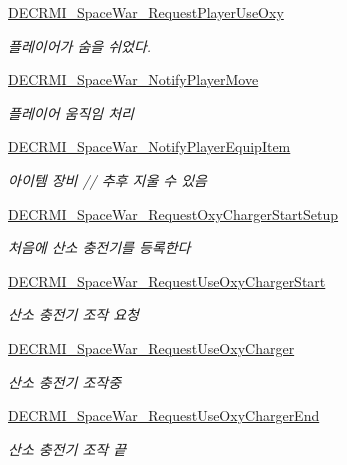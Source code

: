 \begin{DoxyCompactItemize}
\hyperlink{class_server_ab6e38c5e64aecc2a60ef4301d4dd3376}{D\+E\+C\+R\+M\+I\+\_\+\+Space\+War\+\_\+\+Request\+Player\+Use\+Oxy}
\begin{DoxyCompactList}\small\item\em 플레이어가 숨을 쉬었다. \end{DoxyCompactList}\item 
\hyperlink{class_server_a513d5189f9ce57d2e4e35c3128677ce4}{D\+E\+C\+R\+M\+I\+\_\+\+Space\+War\+\_\+\+Notify\+Player\+Move}
\begin{DoxyCompactList}\small\item\em 플레이어 움직임 처리 \end{DoxyCompactList}\item 
\hyperlink{class_server_afc97eded17d998b195ab89607b02a675}{D\+E\+C\+R\+M\+I\+\_\+\+Space\+War\+\_\+\+Notify\+Player\+Equip\+Item}
\begin{DoxyCompactList}\small\item\em 아이템 장비 // 추후 지울 수 있음 \end{DoxyCompactList}\item 
\hyperlink{class_server_a1a23e711fabff6f68f93c98ce1cd7f32}{D\+E\+C\+R\+M\+I\+\_\+\+Space\+War\+\_\+\+Request\+Oxy\+Charger\+Start\+Setup}
\begin{DoxyCompactList}\small\item\em 처음에 산소 충전기를 등록한다 \end{DoxyCompactList}\item 
\hyperlink{class_server_a38fce11d4a2b2338b70c9a6f502e31d0}{D\+E\+C\+R\+M\+I\+\_\+\+Space\+War\+\_\+\+Request\+Use\+Oxy\+Charger\+Start}
\begin{DoxyCompactList}\small\item\em 산소 충전기 조작 요청 \end{DoxyCompactList}\item 
\hyperlink{class_server_ae1707d842a43e962f771f41c216e0ed3}{D\+E\+C\+R\+M\+I\+\_\+\+Space\+War\+\_\+\+Request\+Use\+Oxy\+Charger}
\begin{DoxyCompactList}\small\item\em 산소 충전기 조작중 \end{DoxyCompactList}\item 
\hyperlink{class_server_abe9b3c44dc9dd233a6cf54147771eb14}{D\+E\+C\+R\+M\+I\+\_\+\+Space\+War\+\_\+\+Request\+Use\+Oxy\+Charger\+End}
\begin{DoxyCompactList}\small\item\em 산소 충전기 조작 끝 \end{DoxyCompactList}\item 

\end{DoxyCompactItemize}
